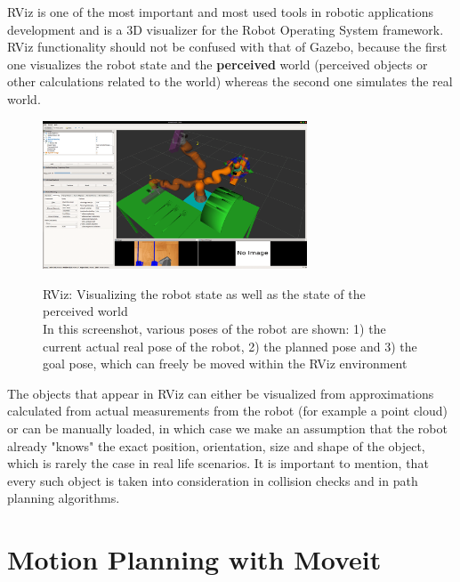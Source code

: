 RViz is one of the most important and most used tools in robotic applications development and is a 3D visualizer for the Robot Operating System framework. RViz functionality should not be confused 
with that of Gazebo, because the first one visualizes the robot state and the \textbf{perceived} world (perceived objects or other calculations related to the world) whereas the second one simulates the real world.

\begin{center}
\begin{figure}[!htb]
\centering
\includegraphics[width=0.7\textwidth]{images/rviz.png}\\
\caption{RViz: Visualizing the robot state as well as the state of the perceived world\\
In this screenshot, various poses of the robot are shown: 1) the current actual real pose of the robot, 2) the planned pose and 3) the goal pose, which can 
freely be moved within the RViz environment}
\end{figure}
\end{center}

The objects that appear in RViz can either be visualized from approximations calculated from actual measurements from the robot (for example a point cloud) or can be manually loaded, in which case we make 
an assumption that the robot already "knows" the exact position, orientation, size and shape of the object, which is rarely the case in real life scenarios.
It is important to mention, that every such object is taken into consideration in collision checks and in path planning algorithms.

\section{Motion Planning with Moveit}
\label{section:moveit}

